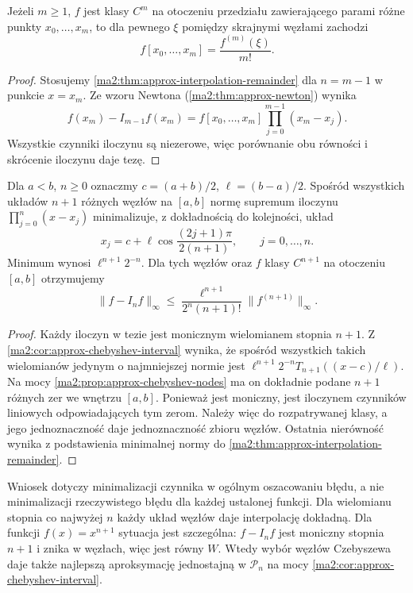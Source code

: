\begin{wniosek}
\label{ma2:cor:approx-divided-mean}
Jeżeli $m\ge1$, $f$ jest klasy $C^m$
na otoczeniu przedziału zawierającego
parami różne punkty $x_0,\ldots,x_m$,
to dla pewnego $\xi$ pomiędzy skrajnymi
węzłami zachodzi
\[
 f[x_0,\ldots,x_m]=\frac{f^{(m)}(\xi)}{m!}.
\]
\end{wniosek}
\begin{proof}
Stosujemy \ref{ma2:thm:approx-interpolation-remainder}
dla $n=m-1$ w punkcie $x=x_m$.
Ze wzoru Newtona (\ref{ma2:thm:approx-newton}) wynika
\[
 f(x_m)-I_{m-1}f(x_m)=
 f[x_0,\ldots,x_m]\prod_{j=0}^{m-1}(x_m-x_j).
\]
Wszystkie czynniki iloczynu są niezerowe,
więc porównanie obu równości i skrócenie
iloczynu daje tezę.
\end{proof}

\begin{twierdzenie}
\label{ma2:thm:approx-chebyshev-interpolation}
Dla $a<b$, $n\ge0$ oznaczmy $c=(a+b)/2$,
$\ell=(b-a)/2$.
Spośród wszystkich układów $n+1$ różnych
węzłów na $[a,b]$ normę supremum iloczynu
$\prod_{j=0}^n(x-x_j)$ minimalizuje,
z dokładnością do kolejności, układ
\[
 x_j=c+\ell\cos\frac{(2j+1)\pi}{2(n+1)},
 \qquad j=0,\ldots,n.
\]
Minimum wynosi $\ell^{n+1}2^{-n}$.
Dla tych węzłów oraz $f$ klasy $C^{n+1}$
na otoczeniu $[a,b]$ otrzymujemy
\[
 \|f-I_nf\|_\infty
 \le \frac{\ell^{n+1}}{2^n(n+1)!}
       \|f^{(n+1)}\|_\infty .
\]
\end{twierdzenie}
\begin{proof}
Każdy iloczyn w tezie jest monicznym
wielomianem stopnia $n+1$.
Z \ref{ma2:cor:approx-chebyshev-interval}
wynika, że spośród wszystkich takich
wielomianów jedynym o najmniejszej normie
jest $\ell^{n+1}2^{-n}T_{n+1}((x-c)/\ell)$.
Na mocy \ref{ma2:prop:approx-chebyshev-nodes}
ma on dokładnie podane $n+1$ różnych zer
we wnętrzu $[a,b]$.
Ponieważ jest moniczny, jest iloczynem
czynników liniowych odpowiadających tym zerom.
Należy więc do rozpatrywanej klasy, a jego
jednoznaczność daje jednoznaczność zbioru węzłów.
Ostatnia nierówność wynika z podstawienia
minimalnej normy do
\ref{ma2:thm:approx-interpolation-remainder}.
\end{proof}

Wniosek dotyczy minimalizacji czynnika w ogólnym
oszacowaniu błędu, a nie minimalizacji rzeczywistego
błędu dla każdej ustalonej funkcji. Dla wielomianu
stopnia co najwyżej $n$ każdy układ węzłów
daje interpolację dokładną. Dla funkcji
$f(x)=x^{n+1}$ sytuacja jest szczególna:
$f-I_nf$ jest moniczny stopnia $n+1$
i znika w węzłach, więc jest równy $W$.
Wtedy wybór węzłów Czebyszewa daje także
najlepszą aproksymację jednostajną w $\mathcal P_n$
na mocy \ref{ma2:cor:approx-chebyshev-interval}.

